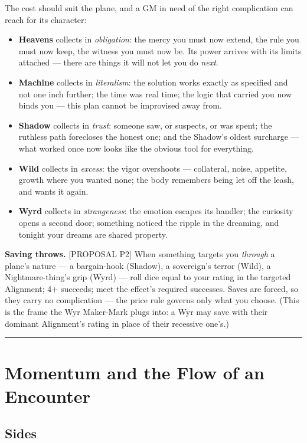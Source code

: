 The cost should suit the plane, and a GM in need of the right complication can reach for its character:

\begin{itemize}
    \item \textbf{Heavens} collects in \textit{obligation}: the mercy you must now extend, the rule you must now keep, the witness you must now be. Its power arrives with its limits attached --- there are things it will not let you do \textit{next}.
    \item \textbf{Machine} collects in \textit{literalism}: the solution works exactly as specified and not one inch further; the time was real time; the logic that carried you now binds you --- this plan cannot be improvised away from.
    \item \textbf{Shadow} collects in \textit{trust}: someone saw, or suspects, or was spent; the ruthless path forecloses the honest one; and the Shadow's oldest surcharge --- what worked once now looks like the obvious tool for everything.
    \item \textbf{Wild} collects in \textit{excess}: the vigor overshoots --- collateral, noise, appetite, growth where you wanted none; the body remembers being let off the leash, and wants it again.
    \item \textbf{Wyrd} collects in \textit{strangeness}: the emotion escapes its handler; the curiosity opens a second door; something noticed the ripple in the dreaming, and tonight your dreams are shared property.
\end{itemize}

\textbf{Saving throws.} [PROPOSAL P2] When something targets you \textit{through} a plane's nature --- a bargain-hook (Shadow), a sovereign's terror (Wild), a Nightmare-thing's grip (Wyrd) --- roll dice equal to your rating in the targeted Alignment; 4+ succeeds; meet the effect's required successes. Saves are forced, so they carry no complication --- the price rule governs only what you choose. (This is the frame the Wyr Maker-Mark plugs into: a Wyr may save with their dominant Alignment's rating in place of their recessive one's.)

\medskip\hrule\medskip

\section{Momentum and the Flow of an Encounter}

\subsection{Sides}


